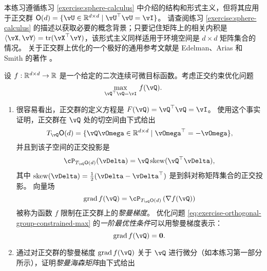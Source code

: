 \documentclass[../../book-main_zh.tex]{subfiles}
\begin{document}
\begin{exercise}\label{exercise:orthogonal-group-calculus}
    本练习遵循练习 \ref{exercise:sphere-calculus} 中介绍的结构和形式主义，但将其应用于正交群 $\O(d) = \set{\vU \in \R^{d \times d} \given \vU^\top \vU = \vI}$。
    请查阅练习 \ref{exercise:sphere-calculus} 的描述以获取必要的概念背景；只要记住矩阵上的相关内积是 $\ip{\vX}{\vY} = \tr(\vX^\top \vY)$，该形式主义同样适用于环境空间是 $d \times d$ 矩阵集合的情况。
    关于正交群上优化的一个极好的通用参考文献是 Edelman、Arias 和 Smith 的著作 \cite{Edelman1998-lg}。
    
    设 $f : \mathbb{R}^{d\times d} \to \mathbb{R}$ 是一个给定的二次连续可微目标函数。考虑正交约束优化问题
    \begin{equation}\label{eq:exercise-orthogonal-group-constrained-max}
        \max_{\vQ^\top \vQ = \vI}\, f(\vQ). 
    \end{equation}
    \begin{enumerate}
        \item 很容易看出，正交群的定义方程是 $F(\vQ) = \vQ^\top \vQ = \vI$。
        使用这个事实证明，正交群在 $\vQ$ 处的切空间由下式给出
        \begin{equation*}
            T_{\vQ} \O(d) = \set{\vQ \vOmega \in \R^{d\times d} \given \vOmega^\top = - \vOmega},
        \end{equation*}
        并且到该子空间的正交投影是
        \begin{equation*}
        \cP_{T_{\vQ}\O(d)}(\vDelta) =  \vQ \Skew(\vQ^\top \vDelta),
        \end{equation*}
        其中 $\Skew(\vDelta) = \tfrac{1}{2} ( \vDelta - \vDelta^\top)$ 是到斜对称矩阵集合的正交投影。
        向量场
        \begin{equation}\label{eq:exercise-riemann-grad-orthogonal-group}
        \mathrm{grad}\, f(\vQ) = \cP_{T_{\vQ} \O(d)} \left( \nabla f(\vQ) \right)
        \end{equation}
        被称为函数 $f$ 限制在正交群上的\textit{黎曼梯度}。
        优化问题 \eqref{eq:exercise-orthogonal-group-constrained-max} 的\textit{一阶最优性条件}可以用黎曼梯度表示：
        \begin{equation*}
            \mathrm{grad}\, f(\vQ) = \mathbf{0}.
        \end{equation*}
        \item 通过对正交群的黎曼梯度 $\mathrm{grad}\, f(\vQ)$ 关于 $\vQ$ 进行微分（如本练习第一部分所示），证明\textit{黎曼海森矩阵}由下式给出
        \begin{equation}\label{eq:exercise-riemann-hess-orthogonal-group}

\end{equation}
\end{enumerate}
\end{exercise}
\end{document}

